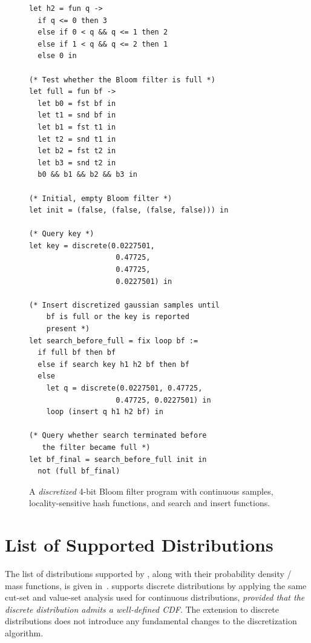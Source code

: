 \begin{figure}[t]
\begin{minipage}[t]{0.46\textwidth}
\begin{lstlisting}
let h2 = fun q ->
  if q <= 0 then 3
  else if 0 < q && q <= 1 then 2
  else if 1 < q && q <= 2 then 1
  else 0 in

(* Test whether the Bloom filter is full *)
let full = fun bf ->
  let b0 = fst bf in
  let t1 = snd bf in
  let b1 = fst t1 in
  let t2 = snd t1 in
  let b2 = fst t2 in
  let b3 = snd t2 in
  b0 && b1 && b2 && b3 in

(* Initial, empty Bloom filter *)
let init = (false, (false, (false, false))) in

(* Query key *)
let key = discrete(0.0227501, 
                    0.47725, 
                    0.47725, 
                    0.0227501) in

(* Insert discretized gaussian samples until 
    bf is full or the key is reported
    present *)
let search_before_full = fix loop bf :=
  if full bf then bf
  else if search key h1 h2 bf then bf
  else
    let q = discrete(0.0227501, 0.47725, 
                    0.47725, 0.0227501) in
    loop (insert q h1 h2 bf) in

(* Query whether search terminated before
   the filter became full *)
let bf_final = search_before_full init in
  not (full bf_final)
    \end{lstlisting}
    \end{minipage}%
    \hspace{4pt}
    
    \caption{A \emph{discretized} 4-bit Bloom filter program with continuous samples, locality-sensitive hash functions, and search and insert functions.}
    \label{fig:app:bloom-filter:disc}
\end{figure}
\clearpage
\section{List of Supported \Slicebf\xspace Distributions}\label{appen:supported-distributions}
The list of distributions supported by \Slice{}, along with their probability density / mass functions, is given in~. \Slice{} supports discrete distributions by applying the same cut-set and value-set analysis used for continuous distributions, \emph{provided that the discrete distribution admits a well-defined CDF}. The extension to discrete distributions does not introduce any fundamental changes to the discretization algorithm.

